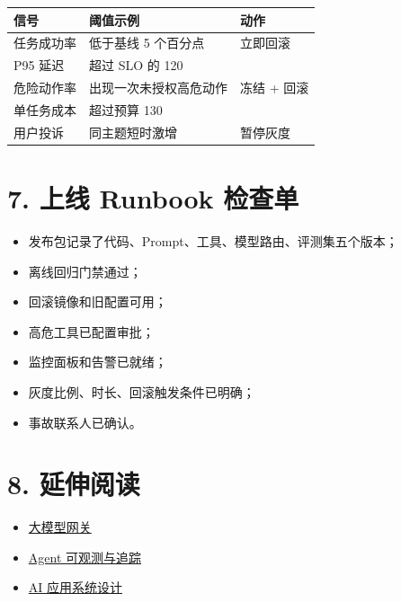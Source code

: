 \documentclass[9pt,a4paper,twocolumn]{ctexart}
\begin{document}
{\footnotesize
\begin{tabular}{|p{}|p{}|p{}|}
\hline
\textbf{信号} & \textbf{阈值示例} & \textbf{动作} \\
\hline
任务成功率 & 低于基线 5 个百分点 & 立即回滚 \\
\hline
P95 延迟 & 超过 SLO 的 120\\%
\hline
危险动作率 & 出现一次未授权高危动作 & 冻结 + 回滚 \\
\hline
单任务成本 & 超过预算 130\\%
\hline
用户投诉 & 同主题短时激增 & 暂停灰度 \\
\hline
\end{tabular}
}



\section*{7. 上线 Runbook 检查单}

\begin{itemize}[itemsep=1pt, topsep=2pt]
  \item [ ] 发布包记录了代码、Prompt、工具、模型路由、评测集五个版本；
  \item [ ] 离线回归门禁通过；
  \item [ ] 回滚镜像和旧配置可用；
  \item [ ] 高危工具已配置审批；
  \item [ ] 监控面板和告警已就绪；
  \item [ ] 灰度比例、时长、回滚触发条件已明确；
  \item [ ] 事故联系人已确认。
\end{itemize}


\section*{8. 延伸阅读}

\begin{itemize}[itemsep=1pt, topsep=2pt]
  \item \href{04-大模型网关.md}{大模型网关}
  \item \href{05-Agent可观测与追踪.md}{Agent 可观测与追踪}
  \item \href{../07-系统设计/01-AI应用系统设计.md}{AI 应用系统设计}
\end{itemize}
\end{document}
